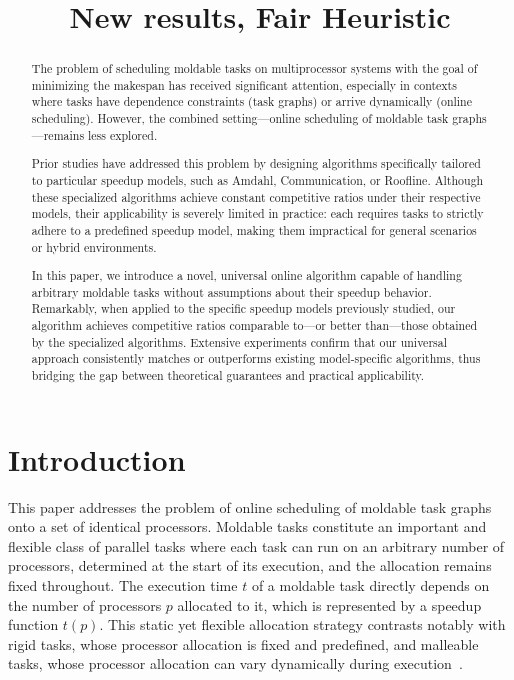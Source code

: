 \documentclass{article}
\begin{document}
\title{New results, Fair Heuristic}

\begin{abstract}
The problem of scheduling moldable tasks on multiprocessor systems with the goal of minimizing the makespan has received significant attention, especially in contexts where tasks have dependence constraints (task graphs) or arrive dynamically (online scheduling). However, the combined setting—online scheduling of moldable task graphs—remains less explored.

Prior studies have addressed this problem by designing algorithms specifically tailored to particular speedup models, such as Amdahl, Communication, or Roofline. Although these specialized algorithms achieve constant competitive ratios under their respective models, their applicability is severely limited in practice: each requires tasks to strictly adhere to a predefined speedup model, making them impractical for general scenarios or hybrid environments.

In this paper, we introduce a novel, universal online algorithm capable of handling arbitrary moldable tasks without assumptions about their speedup behavior. Remarkably, when applied to the specific speedup models previously studied, our algorithm achieves competitive ratios comparable to—or better than—those obtained by the specialized algorithms. Extensive experiments confirm that our universal approach consistently matches or outperforms existing model-specific algorithms, thus bridging the gap between theoretical guarantees and practical applicability.
\end{abstract}


\maketitle
\section{Introduction}

This paper addresses the problem of online scheduling of moldable task graphs onto a set of identical processors. Moldable tasks constitute an important and flexible class of parallel tasks where each task can run on an arbitrary number of processors, determined at the start of its execution, and the allocation remains fixed throughout. The execution time $t$ of a moldable task directly depends on the number of processors $p$ allocated to it, which is represented by a speedup function $t(p)$. This static yet flexible allocation strategy contrasts notably with rigid tasks, whose processor allocation is fixed and predefined, and malleable tasks, whose processor allocation can vary dynamically during execution~\cite{Feitelson96}.
\end{document}
